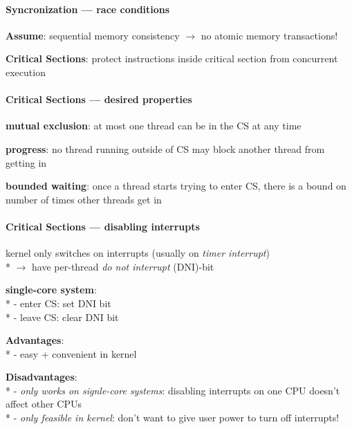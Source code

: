 \paragraph{Syncronization --- race conditions}
\begin{items}
  \item \textbf{Assume}: sequential memory consistency \( \to \) no atomic memory transactions!
  \item \textbf{Critical Sections}: protect instructions inside critical section from concurrent execution
\end{items}

\paragraph{Critical Sections --- desired properties}
\begin{items}
  \item \textbf{mutual exclusion}: at most one thread can be in the CS at any time
  \item \textbf{progress}: no thread running outside of CS may block another thread from getting in
  \item \textbf{bounded waiting}: once a thread starts trying to enter CS, there is a bound on number of times other threads get in
\end{items}

\paragraph{Critical Sections --- disabling interrupts}
\begin{items}
  \item kernel only switches on interrupts (usually on \emph{timer interrupt}) \\*
    \( \to \) have per-thread \emph{do not interrupt} (DNI)-bit
  \item \textbf{single-core system}: \\*
    - enter CS: set DNI bit \\*
    - leave CS: clear DNI bit
  \item \textbf{Advantages}: \\*
    - easy + convenient in kernel
  \item \textbf{Disadvantages}: \\*
    - \emph{only works on signle-core systems}: disabling interrupts on one CPU doesn't affect other CPUs \\*
    - \emph{only feasible in kernel}: don't want to give user power to turn off interrupts!
\end{items}

